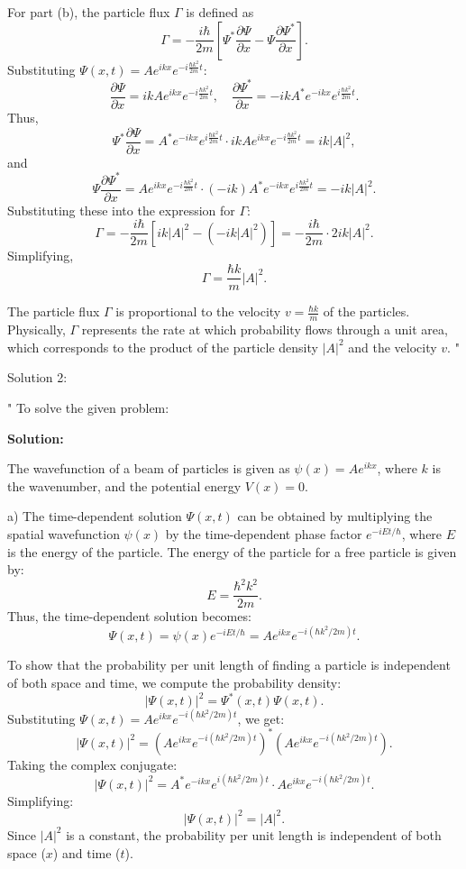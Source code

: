 For part (b), the particle flux $\Gamma$ is defined as  
\[
\Gamma = -\frac{i \hbar}{2m} \left[\Psi^* \frac{\partial \Psi}{\partial x} - \Psi \frac{\partial \Psi^*}{\partial x}\right].
\]  
Substituting $\Psi(x,t) = A e^{ikx} e^{-i \frac{\hbar k^2}{2m} t}$:  
\[
\frac{\partial \Psi}{\partial x} = ik A e^{ikx} e^{-i \frac{\hbar k^2}{2m} t}, \quad \frac{\partial \Psi^*}{\partial x} = -ik A^* e^{-ikx} e^{i \frac{\hbar k^2}{2m} t}.
\]  
Thus,  
\[
\Psi^* \frac{\partial \Psi}{\partial x} = A^* e^{-ikx} e^{i \frac{\hbar k^2}{2m} t} \cdot ik A e^{ikx} e^{-i \frac{\hbar k^2}{2m} t} = ik |A|^2,
\]  
and  
\[
\Psi \frac{\partial \Psi^*}{\partial x} = A e^{ikx} e^{-i \frac{\hbar k^2}{2m} t} \cdot (-ik) A^* e^{-ikx} e^{i \frac{\hbar k^2}{2m} t} = -ik |A|^2.
\]  
Substituting these into the expression for $\Gamma$:  
\[
\Gamma = -\frac{i \hbar}{2m} \left[ik |A|^2 - (-ik |A|^2)\right] = -\frac{i \hbar}{2m} \cdot 2ik |A|^2.
\]  
Simplifying,  
\[
\Gamma = \frac{\hbar k}{m} |A|^2.
\]  

The particle flux $\Gamma$ is proportional to the velocity $v = \frac{\hbar k}{m}$ of the particles. Physically, $\Gamma$ represents the rate at which probability flows through a unit area, which corresponds to the product of the particle density $|A|^2$ and the velocity $v$.
"

Solution 2: 

"
To solve the given problem:

\textbf{Solution:}

The wavefunction of a beam of particles is given as $\psi(x) = A e^{ikx}$, where $k$ is the wavenumber, and the potential energy $V(x) = 0$.

a) The time-dependent solution $\Psi(x,t)$ can be obtained by multiplying the spatial wavefunction $\psi(x)$ by the time-dependent phase factor $e^{-iEt/\hbar}$, where $E$ is the energy of the particle. The energy of the particle for a free particle is given by:
\[
E = \frac{\hbar^2 k^2}{2m}.
\]
Thus, the time-dependent solution becomes:
\[
\Psi(x,t) = \psi(x)e^{-iEt/\hbar} = A e^{ikx} e^{-i(\hbar k^2 / 2m)t}.
\]

To show that the probability per unit length of finding a particle is independent of both space and time, we compute the probability density:
\[
|\Psi(x,t)|^2 = \Psi^*(x,t)\Psi(x,t).
\]
Substituting $\Psi(x,t) = A e^{ikx} e^{-i(\hbar k^2 / 2m)t}$, we get:
\[
|\Psi(x,t)|^2 = \left(A e^{ikx} e^{-i(\hbar k^2 / 2m)t}\right)^* \left(A e^{ikx} e^{-i(\hbar k^2 / 2m)t}\right).
\]
Taking the complex conjugate:
\[
|\Psi(x,t)|^2 = A^* e^{-ikx} e^{i(\hbar k^2 / 2m)t} \cdot A e^{ikx} e^{-i(\hbar k^2 / 2m)t}.
\]
Simplifying:
\[
|\Psi(x,t)|^2 = |A|^2.
\]
Since $|A|^2$ is a constant, the probability per unit length is independent of both space ($x$) and time ($t$).

